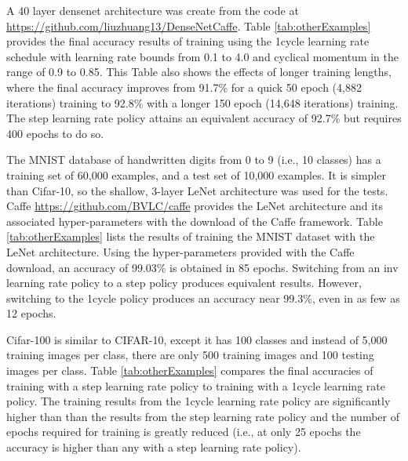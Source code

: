 \documentclass{article}
\begin{document}
A 40 layer densenet architecture was create from the code at \url{https://github.com/liuzhuang13/DenseNetCaffe}. 
Table \ref{tab:otherExamples} provides the final accuracy results of training using the 1cycle learning rate schedule with learning rate bounds from 0.1 to 4.0 and cyclical momentum in the range of 0.9 to 0.85.  This Table also shows the effects of longer training lengths, where the final accuracy improves from 91.7\% for a quick 50 epoch (4,882 iterations) training to 92.8\% with a longer 150 epoch (14,648 iterations) training.  The step learning rate policy attains an equivalent accuracy of 92.7\% but requires 400 epochs to do so.

The MNIST database of handwritten digits from 0 to 9 (i.e., 10 classes)  has a training set of 60,000 examples, and a test set of 10,000 examples.  It is simpler than Cifar-10, so the shallow, 3-layer LeNet architecture was used for the tests.  Caffe \url{https://github.com/BVLC/caffe} provides the LeNet architecture and its associated hyper-parameters with the download of the Caffe framework. 
Table \ref{tab:otherExamples} lists the results of training the MNIST dataset with the LeNet architecture.  Using the hyper-parameters provided with the Caffe download, an accuracy of 99.03\% is obtained in 85 epochs.  Switching from an inv learning rate policy to a step policy produces equivalent results.  However, switching to the 1cycle policy produces an accuracy near 99.3\%, even in as few as 12 epochs.  

Cifar-100 is similar to CIFAR-10, except it has 100 classes and instead of 5,000 training images per class, there are only 500 training images and 100 testing images per class.
Table \ref{tab:otherExamples} compares the final accuracies of training with a step learning rate policy to training with a 1cycle learning rate policy.  The training results from the 1cycle learning rate policy are significantly higher than than the results from the step learning rate policy and the number of epochs required for training is greatly reduced (i.e., at only 25 epochs the accuracy is higher than any with a step learning rate policy).
\end{document}
